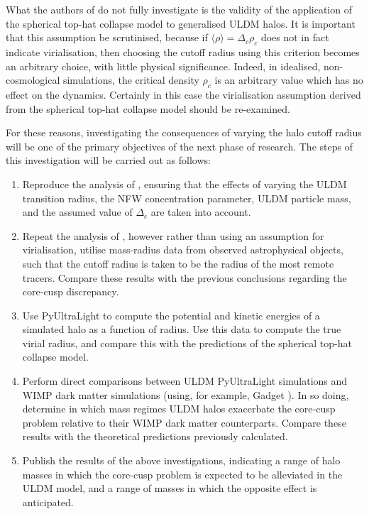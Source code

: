 What the authors of \cite{Robles:2018fur} do not fully investigate is the validity of the application of the spherical top-hat collapse model to generalised ULDM halos. It is important that this assumption be scrutinised, because if $\langle\rho\rangle=\Delta_c\rho_c$ does not in fact indicate virialisation, then choosing the cutoff radius using this criterion becomes an arbitrary choice, with little physical significance. Indeed, in idealised, non-cosmological simulations, the critical density $\rho_c$ is an arbitrary value which has no effect on the dynamics. Certainly in this case the virialisation assumption derived from the spherical top-hat collapse model should be re-examined.

For these reasons, investigating the consequences of varying the halo cutoff radius will be one of the primary objectives of the next phase of research. The steps of this investigation will be carried out as follows:

\begin{enumerate}
    \item Reproduce the analysis of \cite{Robles:2018fur}, ensuring that the effects of varying the ULDM transition radius, the NFW concentration parameter, ULDM particle mass, and the assumed value of $\Delta_c$ are taken into account.
    \item Repeat the analysis of \cite{Robles:2018fur}, however rather than using an assumption for virialisation, utilise mass-radius data from observed astrophysical objects, such that the cutoff radius is taken to be the radius of the most remote tracers. Compare these results with the previous conclusions regarding the core-cusp discrepancy.
    \item Use PyUltraLight to compute the potential and kinetic energies of a simulated halo as a function of radius. Use this data to compute the true virial radius, and compare this with the predictions of the spherical top-hat collapse model.
    \item Perform direct comparisons between ULDM PyUltraLight simulations and WIMP dark matter simulations (using, for example, Gadget \cite{Springel:2005mi}). In so doing, determine in which mass regimes ULDM halos exacerbate the core-cusp problem relative to their WIMP dark matter counterparts. Compare these results with the theoretical predictions previously calculated. 
    \item Publish the results of the above investigations, indicating a range of halo masses in which the core-cusp problem is expected to be alleviated in the ULDM model, and a range of masses in which the opposite effect is anticipated. 
\end{enumerate}


